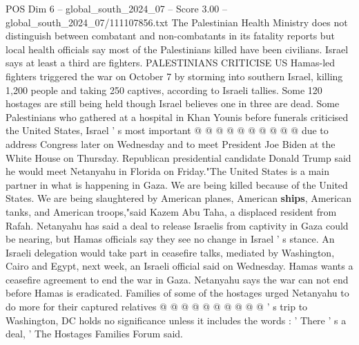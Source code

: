 \begin{textsample}{POS Dim 6 – global\_south\_2024\_07 – Score 3.00 – global\_south\_2024\_07/111107856.txt}
The Palestinian Health Ministry does not distinguish between combatant and non-combatants in its fatality reports but local health officials say most of the Palestinians killed have been civilians.
Israel says at least a third are fighters.
PALESTINIANS CRITICISE US Hamas-led fighters triggered the war on October 7 by storming into southern Israel, killing 1,200 people and taking 250 captives, according to Israeli tallies.
Some 120 hostages are still being held though Israel believes one in three are dead.
Some Palestinians who gathered at a hospital in Khan Younis before funerals criticised the United States, Israel ' s most important @ @ @ @ @ @ @ @ @ @ due to address Congress later on Wednesday and to meet President Joe Biden at the White House on Thursday.
Republican presidential candidate Donald Trump said he would meet Netanyahu in Florida on Friday."The United States is a main partner in what is happening in Gaza.
We are being killed because of the United States.
We are being slaughtered by American planes, American \textbf{ships}, American tanks, and American troops,"said Kazem Abu Taha, a displaced resident from Rafah.
Netanyahu has said a deal to release Israelis from captivity in Gaza could be nearing, but Hamas officials say they see no change in Israel ' s stance.
An Israeli delegation would take part in ceasefire talks, mediated by Washington, Cairo and Egypt, next week, an Israeli official said on Wednesday.
Hamas wants a ceasefire agreement to end the war in Gaza.
Netanyahu says the war can not end before Hamas is eradicated.
Families of some of the hostages urged Netanyahu to do more for their captured relatives @ @ @ @ @ @ @ @ @ @ ' s trip to Washington, DC holds no significance unless it includes the words : ' There ' s a deal, ' The Hostages Families Forum said.

\end{textsample}
